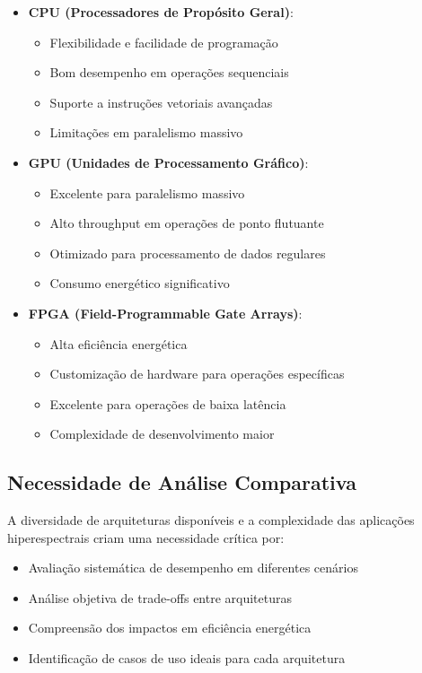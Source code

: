 \begin{itemize}
    \item \textbf{CPU (Processadores de Propósito Geral)}:
    \begin{itemize}
        \item Flexibilidade e facilidade de programação
        \item Bom desempenho em operações sequenciais
        \item Suporte a instruções vetoriais avançadas
        \item Limitações em paralelismo massivo
    \end{itemize}
    
    \item \textbf{GPU (Unidades de Processamento Gráfico)}:
    \begin{itemize}
        \item Excelente para paralelismo massivo
        \item Alto throughput em operações de ponto flutuante
        \item Otimizado para processamento de dados regulares
        \item Consumo energético significativo
    \end{itemize}
    
    \item \textbf{FPGA (Field-Programmable Gate Arrays)}:
    \begin{itemize}
        \item Alta eficiência energética
        \item Customização de hardware para operações específicas
        \item Excelente para operações de baixa latência
        \item Complexidade de desenvolvimento maior
    \end{itemize}
\end{itemize}

\subsection{Necessidade de Análise Comparativa}
A diversidade de arquiteturas disponíveis e a complexidade das aplicações hiperespectrais criam uma necessidade crítica por:

\begin{itemize}
    \item Avaliação sistemática de desempenho em diferentes cenários
    \item Análise objetiva de trade-offs entre arquiteturas
    \item Compreensão dos impactos em eficiência energética
    \item Identificação de casos de uso ideais para cada arquitetura
\end{itemize}

